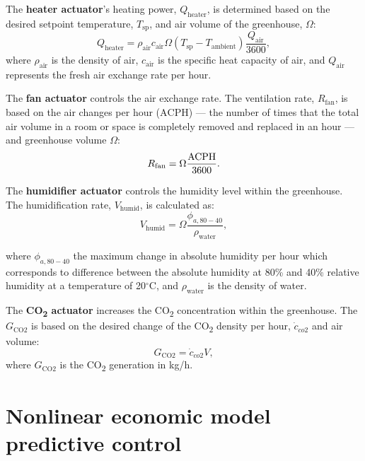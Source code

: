 \documentclass[conference]{IEEEtran}
\begin{document}
The \textbf{heater actuator}'s heating power, \( Q_{\text{heater}} \), is determined based on the desired setpoint temperature, \( T_{\text{sp}} \), and air volume of the greenhouse, \( \Omega \):
\begin{equation}
    Q_{\text{heater}} = \rho_{\text{air}}  c_{\text{air}}  \Omega  (T_{\text{sp}} - T_{\text{ambient}})  \frac{Q_{\text{air}}}{3600},
\end{equation}
where \( \rho_{\text{air}} \) is the density of air, \( c_{\text{air}} \) is the specific heat capacity of air, and \( Q_{\text{air}} \) represents the fresh air exchange rate per hour.

The \textbf{fan actuator} controls the air exchange rate. The ventilation rate, \( R_{\text{fan}} \), is based on the air changes per hour (\( \text{ACPH} \)) --- the number of times that the total air volume in a room or space is completely removed and replaced in an hour --- and greenhouse volume \(\Omega\):
\begin{equation}
    R_{\text{fan}} = \Omega \frac{\text{\( \text{ACPH} \)}}{3600}.
\end{equation}

The \textbf{humidifier actuator} controls the humidity level within the greenhouse. The humidification rate, \( V_{\text{humid}} \), is calculated as:
\begin{equation}
    V_{\text{humid}} = \Omega \frac{\phi_{a, 80 - 40}}{\rho_{\text{water}}},
\end{equation}

where \( \phi_{a, 80 - 40} \) the maximum change in absolute humidity per hour which corresponds to difference between the absolute humidity at 80\% and 40\% relative humidity at a temperature of 20\( ^\circ \)C, and \( \rho_{\text{water}} \) is the density of water.

The \textbf{CO\textsubscript{2} actuator} increases the CO\textsubscript{2} concentration within the greenhouse. The \( G_{\text{CO2}} \) is based on the desired change of the CO\textsubscript{2} density per hour, \( \dot{c}_{co2} \) and air volume:
\begin{equation}
    G_{\text{CO2}} = \dot{c}_{co2}  V,
\end{equation}
where \( G_{\text{CO2}} \) is the CO\textsubscript{2} generation in kg/h.


\section{Nonlinear economic model predictive control}\label{sec:mpc}
\end{document}
